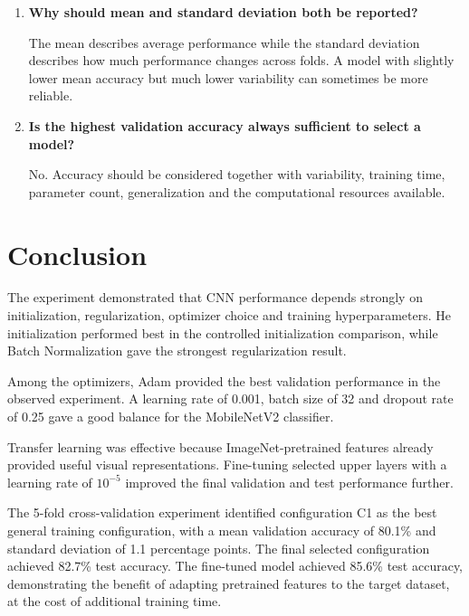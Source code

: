 \documentclass[12pt,a4paper]{article}
\begin{document}
\begin{enumerate}[leftmargin=*]
Using the test set repeatedly during tuning causes information from the test
data to influence model selection. This makes the final test accuracy an
optimistic estimate of generalization.

\item \textbf{Why should mean and standard deviation both be reported?}

The mean describes average performance while the standard deviation describes
how much performance changes across folds. A model with slightly lower mean
accuracy but much lower variability can sometimes be more reliable.

\item \textbf{Is the highest validation accuracy always sufficient to select a model?}

No. Accuracy should be considered together with variability, training time,
parameter count, generalization and the computational resources available.

\end{enumerate}

\section{Conclusion}

The experiment demonstrated that CNN performance depends strongly on
initialization, regularization, optimizer choice and training
hyperparameters. He initialization performed best in the controlled
initialization comparison, while Batch Normalization gave the strongest
regularization result.

Among the optimizers, Adam provided the best validation performance in the
observed experiment. A learning rate of 0.001, batch size of 32 and dropout
rate of 0.25 gave a good balance for the MobileNetV2 classifier.

Transfer learning was effective because ImageNet-pretrained features already
provided useful visual representations. Fine-tuning selected upper layers
with a learning rate of $10^{-5}$ improved the final validation and test
performance further.

The 5-fold cross-validation experiment identified configuration C1 as the
best general training configuration, with a mean validation accuracy of
80.1\% and standard deviation of 1.1 percentage points. The final selected
configuration achieved 82.7\% test accuracy. The fine-tuned model achieved
85.6\% test accuracy, demonstrating the benefit of adapting pretrained
features to the target dataset, at the cost of additional training time.
\end{document}
